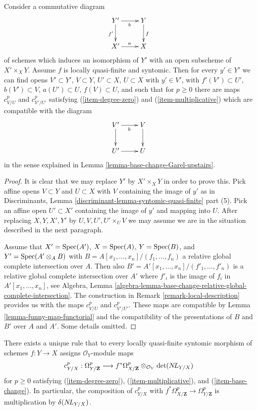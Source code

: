 \begin{lemma}
\label{lemma-existence-base-change-Garel-upstairs}
Consider a commutative diagram
$$
\xymatrix{
Y' \ar[d]_{f'} \ar[r]_b & Y \ar[d]^f \\
X' \ar[r]^a & X
}
$$
of schemes which induces an isomorphism of $Y'$ with an open subscheme of
$X' \times_X Y$. Assume $f$ is locally quasi-finite and syntomic. Then for
every $y' \in Y'$ we can find opens $V' \subset Y'$,
$V \subset Y$, $U' \subset X$, $U \subset X$ with $y' \in V'$, with
$f'(V') \subset U'$, $b(V') \subset V$, $a(U') \subset U$,
$f(V) \subset U$, and such that for $p \geq 0$ there are maps
$c^p_{V/U}$ and $c^p_{V'/U'}$ satisfying (\ref{item-degree-zero})
and (\ref{item-multiplicative}) which are compatible with the diagram
$$
\xymatrix{
V' \ar[d] \ar[r]_b & V \ar[d] \\
U' \ar[r] & U
}
$$
in the sense explained in Lemma \ref{lemma-base-change-Garel-upstairs}.
\end{lemma}

\begin{proof}
It is clear that we may replace $Y'$ by $X' \times_X Y$ in order to prove this.
Pick affine opens $V \subset Y$ and $U \subset X$ with $V$ containing
the image of $y'$ as in
Discriminants, Lemma \ref{discriminant-lemma-syntomic-quasi-finite} part (5).
Pick an affine open $U' \subset X'$ containing the image of $y'$
and mapping into $U$. After replacing $X, Y, X', Y'$ by
$U, V, U', U' \times_U V$ we may assume we are in the situation
described in the next paragraph.

\medskip\noindent
Assume that $X' = \mathop{\mathrm{Spec}}(A')$, $X = \mathop{\mathrm{Spec}}(A)$, $Y = \mathop{\mathrm{Spec}}(B)$, and
$Y' = \mathop{\mathrm{Spec}}(A' \otimes_A B)$ with $B = A[x_1, \ldots, x_n]/(f_1, \ldots, f_n)$
a relative global complete intersection over $A$. Then also
$B' = A'[x_1, \ldots, x_n]/(f'_1, \ldots, f'_n)$ is a relative
global complete intersection over $A'$ where $f'_i$ is the image of $f_i$
in $A'[x_1, \ldots, x_n]$, see Algebra, Lemma
\ref{algebra-lemma-base-change-relative-global-complete-intersection}.
The construction in Remark \ref{remark-local-description}
provides us with the maps $c^p_{V/U}$ and $c^p_{V'/U'}$.
These maps are compatible by Lemma \ref{lemma-funny-map-functorial}
and the compatibility of the presentations of $B$ and $B'$ over
$A$ and $A'$. Some details omitted.
\end{proof}

\begin{lemma}
\label{lemma-Garel-upstairs}
There exists a unique rule that to every locally quasi-finite syntomic
morphism of schemes $f : Y \to X$ assigns $\mathcal{O}_Y$-module maps
$$
c^p_{Y/X} :
\Omega^p_{Y/\mathbf{Z}}
\longrightarrow
f^*\Omega^p_{X/\mathbf{Z}} \otimes_{\mathcal{O}_Y} \det(\mathop{N\!L}\nolimits_{Y/X})
$$
for $p \geq 0$ satisfying (\ref{item-degree-zero}), (\ref{item-multiplicative}),
and (\ref{item-base-change}). In particular, the composition of
$c^p_{Y/X}$ with $f^*\Omega^p_{X/\mathbf{Z}} \to \Omega^p_{Y/\mathbf{Z}}$
is multiplication by $\delta(\mathop{N\!L}\nolimits_{Y/X})$.
\end{lemma}

